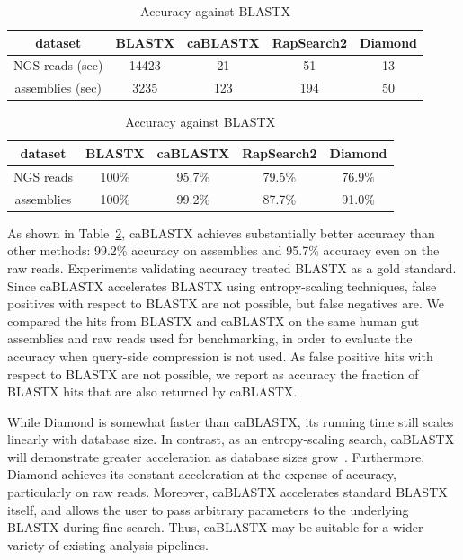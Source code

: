 \documentclass[review,preprint,12pt]{elsarticle}
\renewcommand{\cite}{\citep} %
\theoremstyle{definition}
\theoremstyle{remark}
\numberwithin{equation}{section}
\begin{document}
\begin{table}
\caption{(a) Running time and (b) accuracy of BLASTX, caBLASTX, RapSearch2, and Diamond}
\begin{subtable}{1\textwidth}
\caption{Running time}
\label{mgspeed}
\begin{tabular}{ccccc}
\hline
dataset & BLASTX & caBLASTX & RapSearch2 & Diamond \\
\hline
NGS reads (sec) & 14423 & 21 & 51 & 13 \\
\hline
assemblies (sec) & 3235 & 123 & 194 & 50 \\
\hline
\end{tabular}
\end{subtable}

\begin{subtable}{1\textwidth}
\caption{Accuracy against BLASTX}
\label{mgacc}
\begin{tabular}{ccccc}
\hline
dataset & BLASTX & caBLASTX & RapSearch2 & Diamond \\
\hline
NGS reads & 100\% & 95.7\% & 79.5\% & 76.9\% \\
\hline
assemblies & 100\% & 99.2\% & 87.7\% & 91.0\% \\
\hline
\end{tabular}
\end{subtable}
\end{table}

As shown in Table~\ref{mgacc}, caBLASTX achieves substantially better accuracy
than other methods: 99.2\% accuracy on assemblies and 95.7\% 
accuracy even on the raw reads.
Experiments validating accuracy treated BLASTX as a gold standard. 
Since caBLASTX accelerates BLASTX
using entropy-scaling techniques, false positives with respect to BLASTX are 
not possible, but false negatives are.
We compared the hits from BLASTX and caBLASTX on the same human gut
assemblies and raw reads used for benchmarking, in order to evaluate the accuracy when
query-side compression is not used.
As false positive hits with respect to BLASTX are not possible, we report as 
accuracy the fraction of BLASTX hits that are also returned by caBLASTX.

While Diamond is somewhat faster than caBLASTX, its running time still scales
linearly with database size.
In contrast, as an entropy-scaling search, caBLASTX will demonstrate greater
acceleration as database sizes grow~\cite{daniels2013compressive}.
Furthermore, Diamond achieves its constant acceleration at the expense of 
accuracy, particularly on raw reads.
Moreover, caBLASTX accelerates standard BLASTX itself, and allows the
user to pass arbitrary parameters to the underlying BLASTX during fine search.
Thus, caBLASTX may be suitable for a wider variety of existing analysis 
pipelines.
\end{document}
